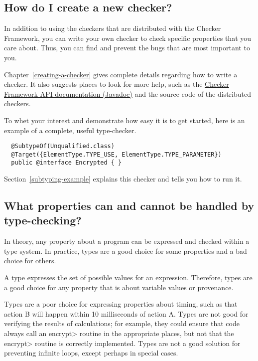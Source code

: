 \subsection{How do I create a new checker?\label{faq-create-a-checker}}

In addition to using the checkers that are distributed with the Checker
Framework, you can write your own checker to check specific properties that
you care about.  Thus, you can find and prevent the bugs that are most
important to you.

Chapter~\ref{creating-a-checker} gives
complete details regarding how to write a checker.  It also suggests places
to look for more help, such as the \href{../api/}{Checker Framework
API documentation (Javadoc)} and the source code of the distributed
checkers.

To whet your interest and demonstrate how easy it is to get started, here
is an example of a complete, useful type-checker.

\begin{Verbatim}
  @SubtypeOf(Unqualified.class)
  @Target({ElementType.TYPE_USE, ElementType.TYPE_PARAMETER})
  public @interface Encrypted { }
\end{Verbatim}

Section~\ref{subtyping-example} explains this checker and tells
you how to run it.


\subsection{What properties can and cannot be handled by type-checking?\label{faq-type-properties}}

In theory, any property about a program can be expressed and checked within
a type system.  In practice, types are a good choice for some properties
and a bad choice for others.

A type expresses the set of possible values for an expression.  Therefore,
types are a good choice for any property that is about variable values or
provenance.

Types are a poor choice for expressing properties about timing, such as
that action B will happen within 10 milliseconds of action A.  Types are
not good for verifying the results of calculations; for example, they could
ensure that code always call an \<encrypt> routine in the appropriate
places, but not that the \<encrypt> routine is correctly implemented.
Types are not a good solution for preventing infinite loops, except perhaps
in special cases.


